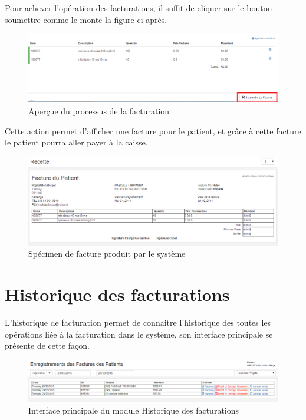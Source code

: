 \documentclass[12pt,a4paper]{report}
\begin{document}
Pour achever l'opération des facturations, il suffit de cliquer sur le bouton soumettre comme le monte la figure ci-après.

\begin{figure}[h]
\begin{center}
\includegraphics[width=14cm]{pic/InterfaceSoumettreFacture.png}
\end{center}
\caption{Aperçue du processus de la facturation}
\label{Aperçue du processus de la facturation}
\end{figure}

Cette action permet d'afficher une facture pour le patient, et grâce à cette facture le patient pourra aller payer à la caisse.


\begin{figure}[h]
\begin{center}
\includegraphics[width=14cm]{pic/InvoiceView.png}
\end{center}
\caption{Spécimen de facture produit par le système}
\label{Spécimen de facture produit par le système}
\end{figure}

\newpage

\section{Historique des facturations}
L'historique de facturation permet de connaitre l'historique des toutes les opérations liée à la facturation dans le système, son interface principale se présente de cette façon.


\begin{figure}[h]
\begin{center} 
\includegraphics[width=14cm]{pic/HistoVente.png}
\end{center}
\caption{Interface principale du module Historique des facturations}
\label{Interface principale du module Historique des facturations}
\end{figure}
\end{document}
